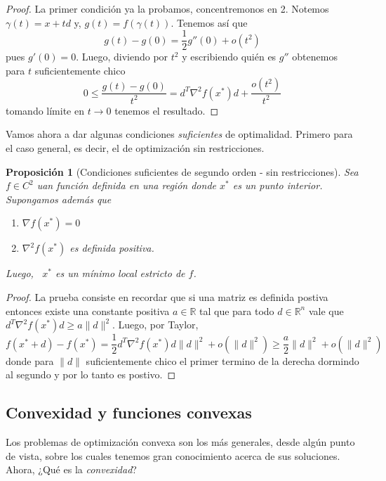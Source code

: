 \documentclass[11pt]{article}
\theoremstyle{ejstyle}
\theoremstyle{ejstyle}
\theoremstyle{ejstyle}
\theoremstyle{ejstyle}
\theoremstyle{ejstyle}
\newtheorem{prop}{Proposición}
\theoremstyle{ejstyle}
\theoremstyle{ejstyle}
\begin{document}
	\begin{proof}
		La primer condición ya la probamos, concentremonos en 2. Notemos $\gamma(t) = x + td$ y, $g(t) = f(\gamma(t))$. Tenemos así que
		$$
		g(t) - g(0) = \frac{1}{2}g''(0) + o(t^{2})
		$$
		pues $g'(0) = 0$. Luego, diviendo por $t^{2}$ y escribiendo quién es $g''$ obtenemos para $t$ suficientemente chico
		$$
		0 \leq \frac{g(t) - g(0)}{t^2} = d^{T} \nabla^{2}f(x^{*})d + \frac{o(t^2)}{t^2}
		$$
		tomando límite en $t \to 0$ tenemos el resultado.
	\end{proof}
	
	Vamos ahora a dar algunas condiciones \emph{suficientes} de optimalidad. Primero para el caso general, es decir, el de optimización sin restricciones.
	
	\begin{prop}[Condiciones suficientes de segundo orden - sin restricciones]
		Sea $f \in C^{2}$ uan función definida en una región donde $x^{*}$ es un punto interior. Supongamos además que
		\begin{enumerate}
			\item $\nabla f(x^{*}) = 0$
			\item $\nabla^{2}f(x^{*})$ es definida positiva.
		\end{enumerate}
		Luego, \, $x^{*}$ es un mínimo local estricto de $f$.
 	\end{prop}
 	
 	\begin{proof}
 		La prueba consiste en recordar que si una matriz es definida postiva entonces existe una constante positiva $a \in \mathbb{R}$ tal que para todo $d \in \mathbb{R}^{n}$ vale que $d^{T} \nabla^{2} f(x^{*})d \geq a \|d\| ^{2}$. Luego, por Taylor, 
 		$$
 		f(x^{*} + d) - f(x^{*}) = \frac{1}{2} d^{T} \nabla^{2} f(x^{*}) d \|d\| ^{2} + o(\|d\|^{2}) \geq \frac{a}{2} \| d\|^{2} + o(\|d\|^2)
 		$$
 		donde para $\| d\|$ suficientemente chico el primer termino de la derecha dormindo al segundo y por lo tanto es postivo.
	\end{proof} 	
	
 	\subsection{Convexidad y funciones convexas}
 	
 	Los problemas de optimización convexa son los más generales, desde algún punto de vista, sobre los cuales tenemos gran conocimiento acerca de sus soluciones. Ahora, ¿Qué es la \emph{convexidad}?
 	
\end{document}
